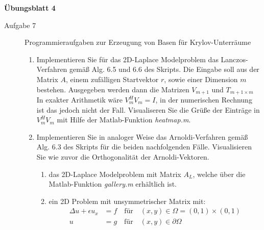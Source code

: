 \documentclass[a4paper,11pt]{scrartcl}
\begin{document}
\aihead

\begin{center}
  {\large\textbf{Übungsblatt 4}}
\end{center}


\begin{description}
    \item[Aufgabe 7] Programmieraufgaben zur Erzeugung von Basen für Krylov-Unterräume
    \begin{enumerate}
    	\item Implementieren Sie für das 2D-Laplace Modelproblem das Lanczos-Verfahren gemäß Alg. 6.5 und 6.6 des Skripts. Die Eingabe soll aus der Matrix $A$, einem zufälligen Startvektor $r$, sowie einer Dimension $m$ bestehen. Ausgegeben werden dann die Matrizen $V_{m+1}$ und $T_{m+1 \times m}$\\
   In exakter Arithmetik wäre $V_m^H V_m = I$, in der numerischen Rechnung ist das jedoch nicht der Fall. Visualiseren Sie die Grüße der Einträge in $V_m^H V_m$ mit Hilfe der Matlab-Funktion \textit{heatmap.m}.
   
		\item Implementieren Sie in analoger Weise das Arnoldi-Verfahren gemäß Alg. 6.3 des Skripts für die beiden nachfolgenden Fälle. Visualisieren Sie wie zuvor die Orthogonalität der Arnoldi-Vektoren.
	\begin{enumerate}[label=(\roman*)]
		\item das 2D-Laplace Modelproblem mit Matrix $A_L$, welche über die Matlab-Funktion \textit{gallery.m} erhältlich ist.
		\item ein 2D Problem mit unsymmetrischer Matrix mit:
		\begin{align*}		
		\Delta u + \epsilon u_x & = f \quad \text{für} \quad (x,y) \in \Omega = (0,1) \times (0,1)\\
		u & = g \quad \text{für} \quad (x,y) \in \partial \Omega		
		\end{align*}
		
\begin{figure}[ht]
  \centering
\end{figure}
\end{enumerate}
\end{enumerate}
\end{description}
\end{document}
